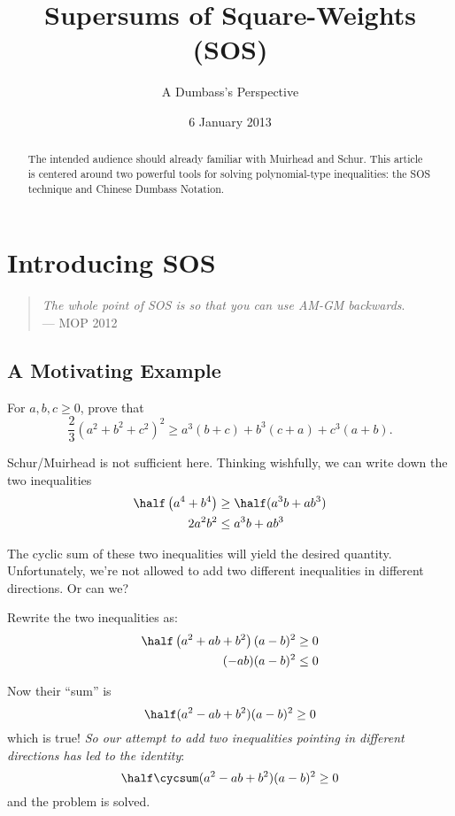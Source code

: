 \documentclass{scrartcl}
\begin{document}
\title{Supersums of Square-Weights (SOS)}
\subtitle{A Dumbass's Perspective}
\date{6 January 2013}
\maketitle

\begin{abstract}
  The intended audience should already familiar with Muirhead and Schur.
  This article is centered around two powerful tools
  for solving polynomial-type inequalities:
  the SOS technique and Chinese Dumbass Notation.
\end{abstract}

\section{Introducing SOS}
\begin{quote}
  \emph{The whole point of SOS is so that you can use AM-GM backwards}. \\
  --- MOP 2012
\end{quote}

\subsection{A Motivating Example}
\begin{example}
  For $a,b,c \ge 0$, prove that \[ \frac{2}{3}(a^2+b^2+c^2)^2 \ge a^3(b+c) + b^3(c+a) + c^3(a+b). \]
\end{example}
\begin{soln}
  Schur/Muirhead is not sufficient here.
  Thinking wishfully, we can write down the two inequalities
  \begin{align*}
    \half \left( a^4+b^4 \right) &\ge \half (a^3b+ab^3) \\
    2a^2b^2 &\le a^3b + ab^3
  \end{align*}

  The cyclic sum of these two inequalities will yield the desired quantity.
  Unfortunately, we're not allowed to add two different inequalities in different directions.
  Or can we?

  Rewrite the two inequalities as:
  \begin{align*}
    \half \left( a^2+ab+b^2 \right)(a-b)^2 &\ge 0 \\
    (-ab)(a-b)^2 &\le 0 \\
  \end{align*}

  Now their ``sum'' is
  \[ \half (a^2-ab+b^2)(a-b)^2 \ge 0 \]
  which is true!
  \emph{So our attempt to add two inequalities pointing in different directions
  has led to the identity}:
  \[ \half \cycsum (a^2-ab+b^2)(a-b)^2 \ge 0 \]
  and the problem is solved.
\end{soln}
\end{document}
